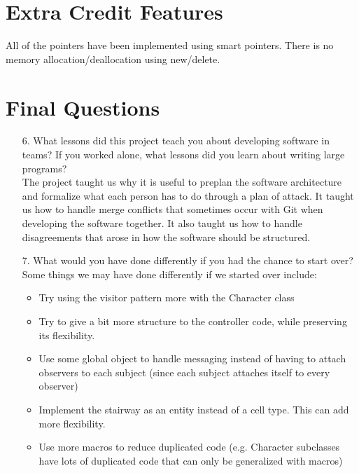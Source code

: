 \documentclass[12pt]{article}
\begin{document}
\section*{Extra Credit Features}

All of the pointers have been implemented using smart pointers. There is no memory allocation/deallocation using new/delete.

\section*{Final Questions}

\begin{enumerate}
\item[6.] What lessons did this project teach you about developing software in teams? If you worked alone, what lessons did you learn about writing large programs? \\

The project taught us why it is useful to preplan the software architecture and formalize what each person has to do through a plan of attack. It taught us how to handle merge conflicts that sometimes occur with Git when developing the software together. It also taught us how to handle disagreements that arose in how the software should be structured.

\item[7.] What would you have done differently if you had the chance to start over? \\

Some things we may have done differently if we started over include: 
\begin{itemize}
\item Try using the visitor pattern more with the Character class
\item Try to give a bit more structure to the controller code, while preserving its flexibility.
\item Use some global object to handle messaging instead of having to attach observers to each subject (since each subject attaches itself to every observer)
\item Implement the stairway as an entity instead of a cell type. This can add more flexibility.
\item Use more macros to reduce duplicated code (e.g. Character subclasses have lots of duplicated code that can only be generalized with macros)
\end{itemize}

\end{enumerate}
\end{document}
